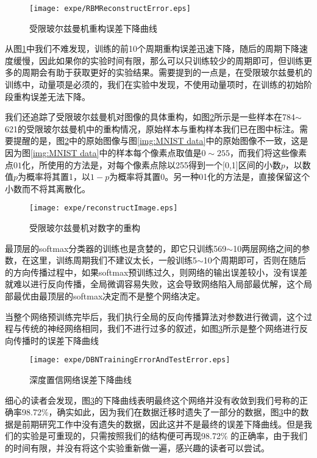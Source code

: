 \begin{figure}[!htbp]
\centering
\texttt{[image: expe/RBMReconstructError.eps]}
\caption{受限玻尔兹曼机重构误差下降曲线}
\label{img:Reconstruct Error des}
\end{figure}

从图\ref{img:Reconstruct Error des}中我们不难发现，训练的前10个周期重构误差迅速下降，随后的周期下降速度缓慢，因此如果你的实验时间有限，那么可以只训练较少的周期即可，但训练更多的周期会有助于获取更好的实验结果。需要提到的一点是，在受限玻尔兹曼机的训练中，动量项是必须的，我们在实验中发现，不使用动量项时，在训练的初始阶段重构误差无法下降。

我们还追踪了受限玻尔兹曼机对图像的具体重构，如图\ref{img:Reconstruct Number}所示是一些样本在784$\sim$621的受限玻尔兹曼机中的重构情况，原始样本与重构样本我们已在图中标注。需要提醒的是，图\ref{img:Reconstruct Number}中的原始图像与图\ref{img:MNIST data}中的原始图像不一致，这是因为图\ref{img:MNIST data}中的样本每个像素点取值是$0\sim255$，而我们将这些像素点$01$化，所使用的方法是，对每个像素点除以255得到一个[0,1]区间的小数$p$，以数值$p$为概率将其置1，以$1-p$为概率将其置0。另一种01化的方法是，直接保留这个小数而不将其离散化。

\begin{figure}[!htbp]
\centering
\texttt{[image: expe/reconstructImage.eps]}
\caption{受限玻尔兹曼机对数字的重构}
\label{img:Reconstruct Number}
\end{figure}

最顶层的softmax分类器的训练也是贪婪的，即它只训练569$\sim$10两层网络之间的参数，在这里，训练周期我们不建议太长，一般训练5$\sim$10个周期即可，否则在随后的方向传播过程中，如果softmax预训练过久，则网络的输出误差较小，没有误差就难以进行反向传播，全局微调容易失败，这会导致网络陷入局部最优解，这个局部最优由最顶层的softmax决定而不是整个网络决定。

当整个网络预训练完毕后，我们执行全局的反向传播算法对参数进行微调，这个过程与传统的神经网络相同，我们不进行过多的叙述，如图\ref{img:DBN Error des}所示是整个网络进行反向传播时的误差下降曲线

\begin{figure}[!htbp]
\centering
\texttt{[image: expe/DBNTrainingErrorAndTestError.eps]}
\caption{深度置信网络误差下降曲线}
\label{img:DBN Error des}
\end{figure}

细心的读者会发现，图\ref{img:DBN Error des}的下降曲线表明最终这个网络并没有收敛到我们号称的正确率98.72\%，确实如此，因为我们在数据迁移时遗失了一部分的数据，图\ref{img:DBN Error des}中的数据是前期研究工作中没有遗失的数据，因此这并不是最终的误差下降曲线。但是我们的实验是可重现的，只需按照我们的结构便可再现98.72\% 的正确率，由于我们的时间有限，并没有将这个实验重新做一遍，感兴趣的读者可以尝试。

